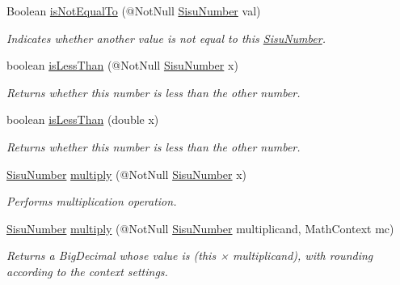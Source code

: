 \begin{DoxyCompactItemize}
Boolean \hyperlink{classcom_1_1aarrelaakso_1_1drawl_1_1_sisu_number_a5a2671cf522e748eca2e340ed2ceb8da}{is\+Not\+Equal\+To} (@Not\+Null \hyperlink{classcom_1_1aarrelaakso_1_1drawl_1_1_sisu_number}{Sisu\+Number} val)
\begin{DoxyCompactList}\small\item\em Indicates whether another value is not equal to this \hyperlink{classcom_1_1aarrelaakso_1_1drawl_1_1_sisu_number}{Sisu\+Number}. \end{DoxyCompactList}\item 
boolean \hyperlink{classcom_1_1aarrelaakso_1_1drawl_1_1_sisu_number_adcf5084049ad72bd2bca1eb9c2dceea0}{is\+Less\+Than} (@Not\+Null \hyperlink{classcom_1_1aarrelaakso_1_1drawl_1_1_sisu_number}{Sisu\+Number} x)
\begin{DoxyCompactList}\small\item\em Returns whether this number is less than the other number. \end{DoxyCompactList}\item 
boolean \hyperlink{classcom_1_1aarrelaakso_1_1drawl_1_1_sisu_number_afd65143333e3b7bbaa54f842e2cb9408}{is\+Less\+Than} (double x)
\begin{DoxyCompactList}\small\item\em Returns whether this number is less than the other number. \end{DoxyCompactList}\item 
\hyperlink{classcom_1_1aarrelaakso_1_1drawl_1_1_sisu_number}{Sisu\+Number} \hyperlink{classcom_1_1aarrelaakso_1_1drawl_1_1_sisu_number_a325d58612f62bbc0e53f4d5c0fa3fb34}{multiply} (@Not\+Null \hyperlink{classcom_1_1aarrelaakso_1_1drawl_1_1_sisu_number}{Sisu\+Number} x)
\begin{DoxyCompactList}\small\item\em Performs multiplication operation. \end{DoxyCompactList}\item 
\hyperlink{classcom_1_1aarrelaakso_1_1drawl_1_1_sisu_number}{Sisu\+Number} \hyperlink{classcom_1_1aarrelaakso_1_1drawl_1_1_sisu_number_ae4643a555dad58a29ca89a55073a786a}{multiply} (@Not\+Null \hyperlink{classcom_1_1aarrelaakso_1_1drawl_1_1_sisu_number}{Sisu\+Number} multiplicand, Math\+Context mc)
\begin{DoxyCompactList}\small\item\em Returns a Big\+Decimal whose value is (this × multiplicand), with rounding according to the context settings. \end{DoxyCompactList}\item 

\end{DoxyCompactItemize}
